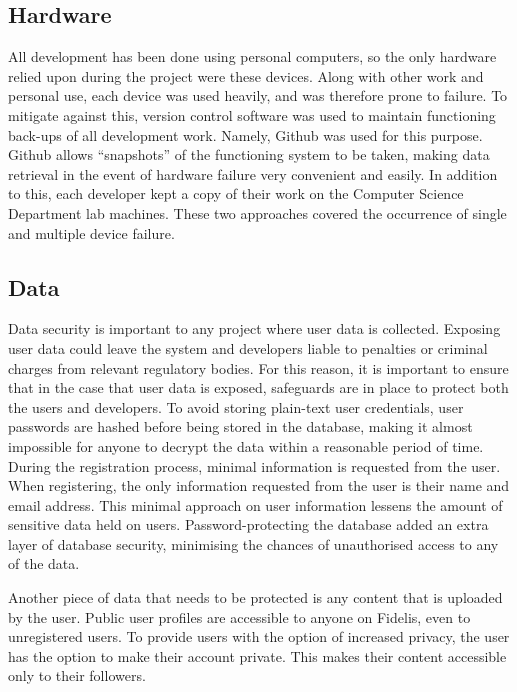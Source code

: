 \subsection{Hardware}
All development has been done using personal computers, so the only hardware relied upon during the project were these devices. Along with other work and personal use, each device was used heavily, and was therefore prone to failure. To mitigate against this, version control software was used to maintain functioning back-ups of all development work. Namely, Github was used for this purpose. Github allows ``snapshots'' of the functioning system to be taken, making data retrieval in the event of hardware failure very convenient and easily. In addition to this, each developer kept a copy of their work on the Computer Science Department lab machines. These two approaches covered the occurrence of single and multiple device failure.

\subsection{Data}
Data security is important to any project where user data is collected. Exposing user data could leave the system and developers liable to penalties or criminal charges from relevant regulatory bodies. For this reason, it is important to ensure that in the case that user data is exposed, safeguards are in place to protect both the users and developers. To avoid storing plain-text user credentials, user passwords are hashed before being stored in the database, making it almost impossible for anyone to decrypt the data within a reasonable period of time. During the registration process, minimal information is requested from the user. When registering, the only information requested from the user is their name and email address. This minimal approach on user information lessens the amount of sensitive data held on users. Password-protecting the database added an extra layer of database security, minimising the chances of unauthorised access to any of the data.

Another piece of data that needs to be protected is any content that is uploaded by the user. Public user profiles are accessible to anyone on Fidelis, even to unregistered users. To provide users with the option of increased privacy, the user has the option to make their account private. This makes their content accessible only to their followers.

